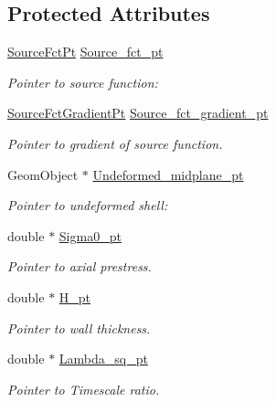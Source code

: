 \subsection*{Protected Attributes}
\begin{DoxyCompactItemize}
\item 
\hyperlink{classoomph_1_1MyShellEquations_a056d2488b6e65787f5c9935a321b7a9b}{Source\+Fct\+Pt} \hyperlink{classoomph_1_1MyShellEquations_a60988a3591e836a2afecf416d1287985}{Source\+\_\+fct\+\_\+pt}
\begin{DoxyCompactList}\small\item\em Pointer to source function\+: \end{DoxyCompactList}\item 
\hyperlink{classoomph_1_1MyShellEquations_a954dcc1b78710f331ed390b716aa07dd}{Source\+Fct\+Gradient\+Pt} \hyperlink{classoomph_1_1MyShellEquations_ab45cb2cb03c75c4410fa4288f9a8be90}{Source\+\_\+fct\+\_\+gradient\+\_\+pt}
\begin{DoxyCompactList}\small\item\em Pointer to gradient of source function. \end{DoxyCompactList}\item 
Geom\+Object $\ast$ \hyperlink{classoomph_1_1MyShellEquations_acf0107874213e70145eae84dfb3d4b5a}{Undeformed\+\_\+midplane\+\_\+pt}
\begin{DoxyCompactList}\small\item\em Pointer to undeformed shell\+: \end{DoxyCompactList}\item 
double $\ast$ \hyperlink{classoomph_1_1MyShellEquations_a909b1e9608109048d446f86ca3c7d02d}{Sigma0\+\_\+pt}
\begin{DoxyCompactList}\small\item\em Pointer to axial prestress. \end{DoxyCompactList}\item 
double $\ast$ \hyperlink{classoomph_1_1MyShellEquations_a6cd7175e7205dc7cea4e0e505f3cb8b9}{H\+\_\+pt}
\begin{DoxyCompactList}\small\item\em Pointer to wall thickness. \end{DoxyCompactList}\item 
double $\ast$ \hyperlink{classoomph_1_1MyShellEquations_a6201b3eced8396c6e2246df94c946537}{Lambda\+\_\+sq\+\_\+pt}
\begin{DoxyCompactList}\small\item\em Pointer to Timescale ratio. \end{DoxyCompactList}\end{DoxyCompactItemize}


